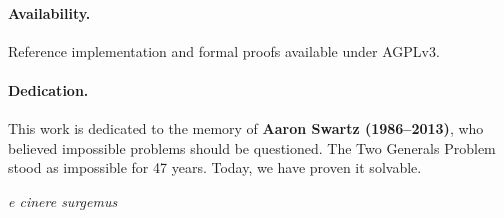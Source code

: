 \paragraph{Availability.}
Reference implementation and formal proofs available under AGPLv3.

\paragraph{Dedication.}
This work is dedicated to the memory of \textbf{Aaron Swartz (1986--2013)}, who believed impossible problems should be questioned. The Two Generals Problem stood as impossible for 47 years. Today, we have proven it solvable.

\begin{center}
\textit{e cinere surgemus}
\end{center}

